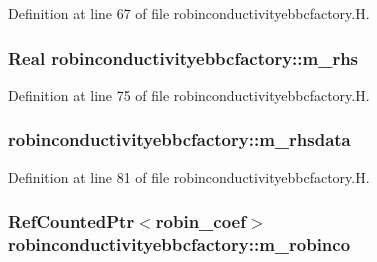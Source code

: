Definition at line 67 of file robinconductivityebbcfactory.\+H.

\subsubsection[{\texorpdfstring{m\+\_\+rhs}{m_rhs}}]{\setlength{\rightskip}{0pt plus 5cm}Real robinconductivityebbcfactory\+::m\+\_\+rhs\hspace{0.3cm}{\ttfamily [protected]}}\hypertarget{classrobinconductivityebbcfactory_a809f7d59a8ae38ed5ce8f3d0608180e5}{}\label{classrobinconductivityebbcfactory_a809f7d59a8ae38ed5ce8f3d0608180e5}


Definition at line 75 of file robinconductivityebbcfactory.\+H.

\subsubsection[{\texorpdfstring{m\+\_\+rhsdata}{m_rhsdata}}]{ robinconductivityebbcfactory\+::m\+\_\+rhsdata\hspace{0.3cm}{\ttfamily [protected]}}\hypertarget{classrobinconductivityebbcfactory_ad7c849e5bb478b3cf0e80ac542354fda}{}\label{classrobinconductivityebbcfactory_ad7c849e5bb478b3cf0e80ac542354fda}


Definition at line 81 of file robinconductivityebbcfactory.\+H.

\subsubsection[{\texorpdfstring{m\+\_\+robinco}{m_robinco}}]{\setlength{\rightskip}{0pt plus 5cm}Ref\+Counted\+Ptr$<${\bf robin\+\_\+coef}$>$ robinconductivityebbcfactory\+::m\+\_\+robinco\hspace{0.3cm}{\ttfamily [protected]}}\hypertarget{classrobinconductivityebbcfactory_a7b45b109f2deedfeeb5c56b0d71a4241}{}\label{classrobinconductivityebbcfactory_a7b45b109f2deedfeeb5c56b0d71a4241}


